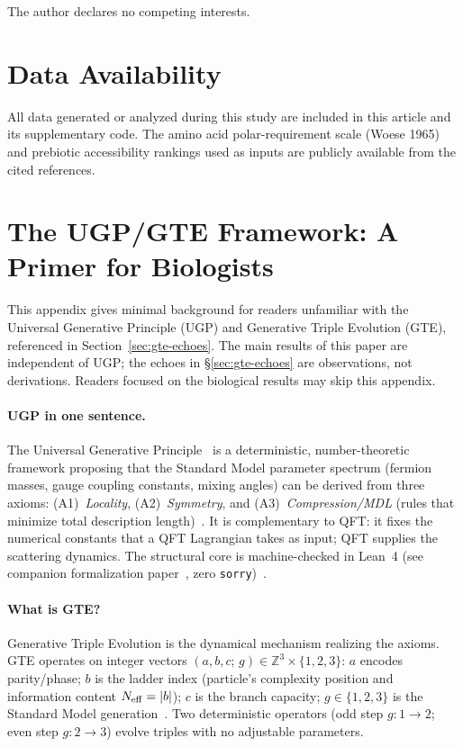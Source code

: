 \documentclass[10pt,twocolumn]{article}
\begin{document}
The author declares no competing interests.

\section*{Data Availability}

All data generated or analyzed during this study are included in this
article and its supplementary code. The amino acid polar-requirement
scale (Woese 1965) and prebiotic accessibility rankings used as inputs
are publicly available from the cited references.

\section{The UGP/GTE Framework: A Primer for Biologists}
\label{app:gte}

This appendix gives minimal background for readers unfamiliar with the
Universal Generative Principle (UGP) and Generative Triple Evolution (GTE),
referenced in Section~\ref{sec:gte-echoes}. The main results of this paper
are independent of UGP; the echoes in \S\ref{sec:gte-echoes} are
observations, not derivations. Readers focused on the biological results may
skip this appendix.

\paragraph{UGP in one sentence.}
The Universal Generative Principle~\cite{SpivackUGP} is a deterministic,
number-theoretic framework proposing that the Standard Model parameter
spectrum (fermion masses, gauge coupling constants, mixing angles) can be
derived from three axioms: (A1)~\emph{Locality}, (A2)~\emph{Symmetry}, and
(A3)~\emph{Compression/MDL} (rules that minimize total description
length)~\cite{SpivackUGP}. It is complementary to QFT: it fixes the numerical
constants that a QFT Lagrangian takes as input; QFT supplies the scattering
dynamics. The structural core is machine-checked in Lean~4 (see companion formalization paper~\cite{SpivackUGPFormalization},
zero \texttt{sorry})~\cite{ugp-lean,SpivackUGPFormalization}.

\paragraph{What is GTE?}
Generative Triple Evolution is the dynamical mechanism realizing the axioms.
GTE operates on integer vectors $(a,b,c;\,g)\in\mathbb{Z}^3\times\{1,2,3\}$:
$a$ encodes parity/phase; $b$ is the ladder index (particle's complexity
position and information content $N_{\rm eff}=|b|$); $c$ is the branch
capacity; $g\in\{1,2,3\}$ is the Standard Model generation~\cite{SpivackUGP}.
Two deterministic operators (odd step $g{:}1\to2$; even step $g{:}2\to3$)
evolve triples with no adjustable parameters.
\end{document}
